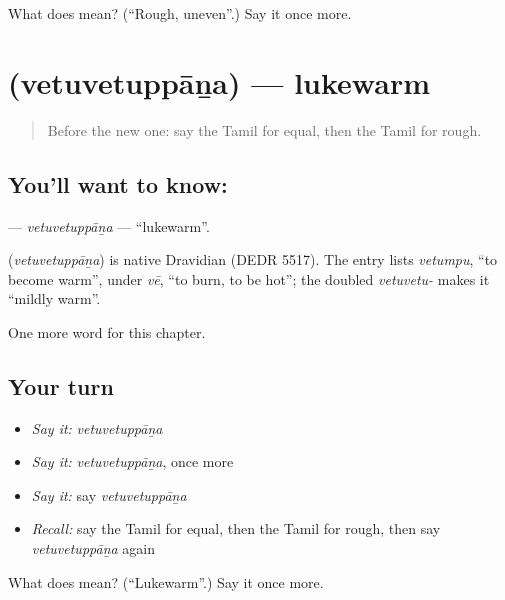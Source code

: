 \begin{tcolorbox}[breakable,colback=teal!4,colframe=teal!35!black,title={Before you move on}]
What does  mean? (\textquotedblleft{}Rough, uneven\textquotedblright{}.) Say it once more.
\end{tcolorbox}
\section[\texorpdfstring{\ta{வெதுவெதுப்பான} (vetuvetuppāṉa)}{வெதுவெதுப்பான (vetuvetuppāṉa)}]{ (vetuvetuppāṉa) — lukewarm}

\label{lesson:TA-C241-vetuvetuppana}



\begin{quote}
Before the new one: say the Tamil for equal, then the Tamil for rough.
\end{quote}

\subsection*{You'll want to know: }
\textbf{} — \emph{vetuvetuppāṉa} — \textquotedblleft{}lukewarm\textquotedblright{}.

\begin{cousinweb}
\textbf{} (\emph{vetuvetuppāṉa}) is native Dravidian (DEDR 5517). The entry lists \emph{vetumpu}, \textquotedblleft{}to become warm\textquotedblright{}, under \emph{vē}, \textquotedblleft{}to burn, to be hot\textquotedblright{}; the doubled \emph{vetuvetu-} makes it \textquotedblleft{}mildly warm\textquotedblright{}.
\end{cousinweb}

\begin{grammarlens}[title={What you've built}]
One more word for this chapter.
\end{grammarlens}

\subsection*{Your turn}
\begin{itemize}
\raggedright
  \item \emph{Say it:} \emph{vetuvetuppāṉa}
  \item \emph{Say it:} \emph{vetuvetuppāṉa}, once more
  \item \emph{Say it:} say \emph{vetuvetuppāṉa}
  \item \emph{Recall:} say the Tamil for equal, then the Tamil for rough, then say \emph{vetuvetuppāṉa} again
\end{itemize}

\begin{tcolorbox}[breakable,colback=teal!4,colframe=teal!35!black,title={Before you move on}]
What does  mean? (\textquotedblleft{}Lukewarm\textquotedblright{}.) Say it once more.
\end{tcolorbox}
